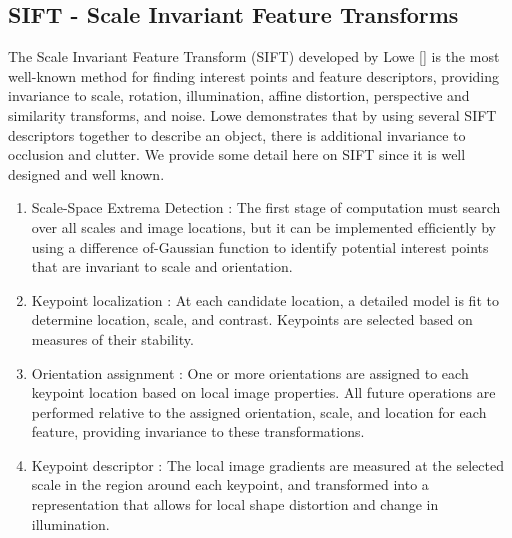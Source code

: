 \subsection{SIFT - Scale Invariant Feature Transforms} \label{siftSection}

The Scale Invariant Feature Transform (SIFT) developed by Lowe \ref{} is the most well-known method for finding interest points and feature descriptors, providing invariance to scale, rotation, illumination, affine distortion, perspective and similarity
transforms, and noise. Lowe demonstrates that by using several SIFT descriptors together to describe an object, there is additional invariance to occlusion and clutter. We provide some detail here on SIFT since it is well designed and well known.


\begin{enumerate}
\item Scale-Space Extrema Detection :
The ﬁrst stage of computation must search over all
scales and image locations, but it can be implemented efﬁciently by using a difference of-Gaussian
function to identify potential interest points that are invariant to scale and
orientation.
\item Keypoint localization :
At each candidate location, a detailed model is ﬁt to determine
location, scale, and contrast. Keypoints are selected based on measures of their
stability.
\item Orientation assignment :
One or more orientations are assigned to each keypoint
location based on local image properties. All future operations are performed relative
to the assigned orientation, scale, and location for each feature, providing invariance
to these transformations.
\item Keypoint descriptor  :
The local image gradients are measured at the selected scale
in the region around each keypoint, and transformed into a representation that allows
for local shape distortion and change in illumination.
\end{enumerate}

